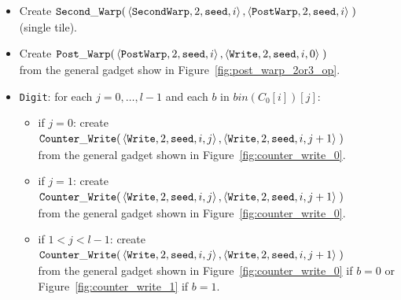 \begin{itemize}
    \item Create
    $\begin{aligned}[t]
        {\tt Second\_Warp}(&\left\langle {\tt SecondWarp}, 2, {\tt seed}, i \right\rangle,
                     \left\langle {\tt PostWarp},   2, {\tt seed}, i \right\rangle \;)
    \end{aligned}$ (single tile).

    \item Create
    $\begin{aligned}[t]
        {\tt Post\_Warp}(&\left\langle {\tt PostWarp}, 2, {\tt seed}, i    \right\rangle,
                   \left\langle {\tt Write},    2, {\tt seed}, i, 0 \right\rangle \;)
    \end{aligned}$\\ from the general gadget show in Figure~\ref{fig:post_warp_2or3_op}.

    \item {\tt Digit}: for each $j=0,\ldots,l-1$ and each $b$ in $bin(C_0[i])[j]$:
    \begin{itemize}
        \item if $j = 0$: create
        $\begin{aligned}[t]
            {\tt Counter\_Write}(&\left\langle {\tt Write}, 2, {\tt seed}, i, j \right\rangle, \left\langle {\tt Write}, 2, {\tt seed}, i, j + 1 \right\rangle \;)
        \end{aligned}$\\from the general gadget shown in Figure~\ref{fig:counter_write_0}.

        \item if $j = 1$: create
        $\begin{aligned}[t]
            {\tt Counter\_Write}(&\left\langle {\tt Write}, 2, {\tt seed}, i, j \right\rangle, \left\langle {\tt Write}, 2, {\tt seed}, i, j + 1 \right\rangle \;)
        \end{aligned}$\\from the general gadget shown in Figure~\ref{fig:counter_write_0}.

        \item if $1 < j < l-1$: create
        $\begin{aligned}[t]
            {\tt Counter\_Write}(&\left\langle {\tt Write}, 2, {\tt seed}, i, j \right\rangle, \left\langle {\tt Write}, 2, {\tt seed}, i, j + 1 \right\rangle \;)
        \end{aligned}$\\from the general gadget shown in Figure~\ref{fig:counter_write_0} if $b = 0$ or Figure~\ref{fig:counter_write_1} if $b = 1$.


\end{itemize}
\end{itemize}

